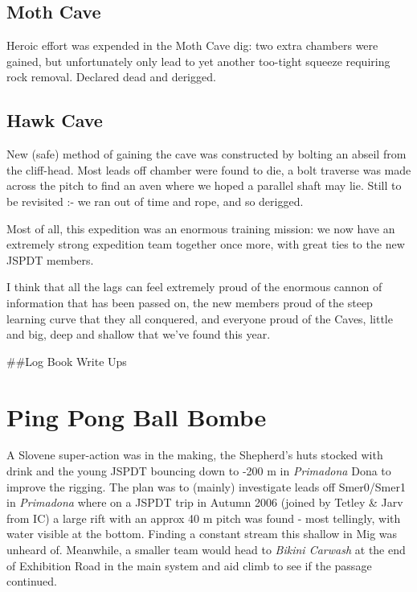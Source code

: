\hypertarget{moth-cave}{%
\subsection{Moth Cave}\label{moth-cave}}

Heroic effort was expended in the Moth Cave dig: two extra chambers were
gained, but unfortunately only lead to yet another too-tight squeeze
requiring rock removal. Declared dead and derigged.

\hypertarget{hawk-cave}{%
\subsection{Hawk Cave}\label{hawk-cave}}

New (safe) method of gaining the cave was constructed by bolting an
abseil from the cliff-head. Most leads off chamber were found to die, a
bolt traverse was made across the pitch to find an aven where we hoped a
parallel shaft may lie. Still to be revisited :- we ran out of time and
rope, and so derigged.

Most of all, this expedition was an enormous training mission: we now
have an extremely strong expedition team together once more, with great
ties to the new JSPDT members.

I think that all the lags can feel extremely proud of the enormous
cannon of information that has been passed on, the new members proud of
the steep learning curve that they all conquered, and everyone proud of
the Caves, little and big, deep and shallow that we've found this year.


\#\#Log Book Write Ups

\hypertarget{ping-pong-ball-bombe}{%
\section{Ping Pong Ball Bombe}\label{ping-pong-ball-bombe}}

A Slovene super-action was in the making, the Shepherd's huts stocked
with drink and the young JSPDT bouncing down to -200 m in
\emph{Primadona} Dona to improve the rigging. The plan was to (mainly)
investigate leads off Smer0/Smer1 in \emph{Primadona} where on a JSPDT
trip in Autumn 2006 (joined by Tetley \& Jarv from IC) a large rift with
an approx 40 m pitch was found - most tellingly, with water visible at
the bottom. Finding a constant stream this shallow in Mig was unheard
of. Meanwhile, a smaller team would head to \emph{Bikini Carwash} at the
end of Exhibition Road in the main system and aid climb to see if the
passage continued.

